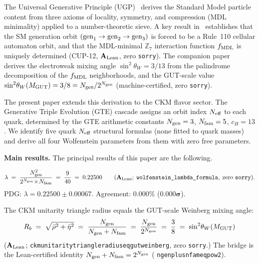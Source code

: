 \documentclass[11pt]{article}
\theoremstyle{remark}
\newcommand{\Ngen}{N_{\rm gen}}
\newcommand{\Nfam}{N_{\rm fam}}
\newcommand{\cH}{c_H}
\newcommand{\lean}[1]{%
  \penalty-100
  \begingroup\def\_{\textunderscore\allowbreak}\texttt{#1}\endgroup}
\newcommand{\lam}{\lambda}
\newcommand{\Rbar}{\bar{\rho}}
\newcommand{\Ebar}{\bar{\eta}}
\newcommand{\Rb}{R_b}
\newcommand{\sinwsq}{\sin^2\!\theta_W}
\newcommand{\CatAL}{\ensuremath{\textbf{A}_{\rm Lean}}}
\begin{document}
\medskip

The Universal Generative Principle (UGP)~\cite{Spivack2026_SM_UGP} derives the
Standard Model particle content from three axioms of locality, symmetry, and
compression (MDL minimality) applied to a number-theoretic sieve.
A key result in~\cite{SpivackCompUniversality} establishes that the SM generation
orbit $({\rm gen}_1 \to {\rm gen}_2 \to {\rm gen}_3)$ is forced to be a Rule~110
cellular automaton orbit, and that the MDL-minimal $\mathbb{Z}_7$ interaction
function $f_{\rm MDL}$ is uniquely determined (CUP-12, $\CatAL$, zero \texttt{sorry}).
The companion paper~\cite{SpivackWeinberg} derives the electroweak mixing angle
$\sinwsq = 3/13$ from the palindrome decomposition of the $f_{\rm MDL}$
neighborhoods, and the GUT-scale value $\sinwsq(M_{\rm GUT}) = 3/8 = \Ngen/2^{\Ngen}$
(machine-certified, zero \texttt{sorry}).

\medskip

The present paper extends this derivation to the CKM flavor sector.
The Generative Triple Evolution (GTE) cascade assigns an orbit index $N_{\rm eff}$
to each quark, determined by the GTE arithmetic constants
$\Ngen = 3$, $\Nfam = 5$, $\cH = 13$.
We identify five quark $N_{\rm eff}$ structural formulas (none fitted to quark masses)
and derive all four Wolfenstein parameters from them with zero free parameters.

\medskip

\textbf{Main results.}
The principal results of this paper are the following.

\begin{tcolorbox}[colback=green!4,colframe=green!45!black,
  title={\textbf{Main result (CKM-1): Leading Wolfenstein parameter}},
  fonttitle=\bfseries,left=6pt,right=6pt,top=4pt,bottom=4pt]
\small
\[
  \lam \;=\; \frac{\Ngen^2}{2^{\Ngen}\!\times\!\Nfam}
        \;=\; \frac{9}{40}
        \;=\; 0.22500
  \qquad (\CatAL;\;\lean{wolfenstein\_lambda\_formula},\;\text{zero }\texttt{sorry}).
\]
PDG: $\lam = 0.22500\pm 0.00067$.  Agreement: $\mathbf{0.000\%}$ ($\mathbf{0.000\sigma}$).
\end{tcolorbox}

\begin{tcolorbox}[colback=green!4,colframe=green!45!black,
  title={\textbf{Main result (CKM-2): Cross-sector identity}},
  fonttitle=\bfseries,left=6pt,right=6pt,top=4pt,bottom=4pt]
\small
The CKM unitarity triangle radius equals the GUT-scale Weinberg mixing angle:
\[
  \Rb \;=\; \sqrt{\Rbar^2+\Ebar^2}
  \;=\; \frac{\Ngen}{\Ngen+\Nfam}
  \;=\; \frac{\Ngen}{2^{\Ngen}}
  \;=\; \frac{3}{8}
  \;=\; \sinwsq(M_{\rm GUT})
\]
($\CatAL$; \lean{ckm\_unitarity\_triangle\_radius\_eq\_gut\_weinberg}, zero \texttt{sorry}.)
The bridge is the Lean-certified identity $\Ngen+\Nfam = 2^{\Ngen}$
(\lean{ngen\_plus\_nfam\_eq\_pow2}).
\end{tcolorbox}
\end{document}
